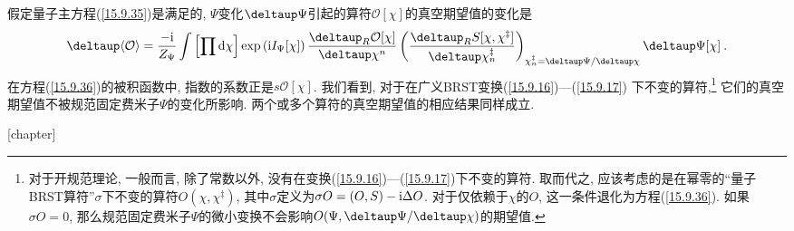 假定量子主方程(\ref{15.9.35})是满足的, $\Psi $变化$\deltaup \Psi $引起的算符$\mathcal{O}[\chi ]$的真空期望值的变化是\begin{equation}
\deltaup \langle \mathcal{O}\rangle =\frac{-\mi}{Z_{\Psi }}\int \left[ \prod %
\dif\chi \right] \exp \left( \mi I_{\Psi }[\chi ]\right) \frac{\deltaup _{R}%
\mathcal{O}[\chi]}{\deltaup \chi ^{n}}\left( \frac{\deltaup _{R}S[\chi ,\chi ^{\ddag }]%
}{\deltaup \chi _{n}^{\ddag }}\right) _{\chi _{n}^{\ddag }=\deltaup \Psi /\deltaup
\chi }\deltaup \Psi [ \chi ]\:.   \label{15.9.36}
\end{equation}%
在方程(\ref{15.9.36})的被积函数中, 指数的系数正是$s\mathcal{O[\chi ]}$. 我们看到, 对于在广义BRST变换(\ref{15.9.16})---(\ref{15.9.17})%
下不变的算符,\footnote{对于开规范理论, 一般而言, 除了常数以外, 没有在变换(\ref{15.9.16})---(\ref{15.9.17})下不变的算符.  取而代之, 应该考虑的是在幂零的``量子BRST算符''$\sigma$下不变的算符$O(\chi,\chi^{\ddag})$, 其中$\sigma$定义为$\sigma O = (O,S)-\mathrm{i} \Delta O$. 对于仅依赖于$\chi$的$O$, 这一条件退化为方程(\ref{15.9.36}). 如果$\sigma O=0$, 那么规范固定费米子$\Psi$的微小变换不会影响$O(\Psi, \deltaup\Psi/\deltaup \chi)$的期望值.\cite{24}} 它们的真空期望值不被规范固定费米子$\Psi $的变化所影响. 两个或多个算符的真空期望值的相应结果同样成立.




[chapter]
\setcounter{app}{1}
\renewcommand\thesection{\Alph{app}}
\renewcommand\theequation{\arabic{chapter}.\Alph{app}.\arabic{equation}}

